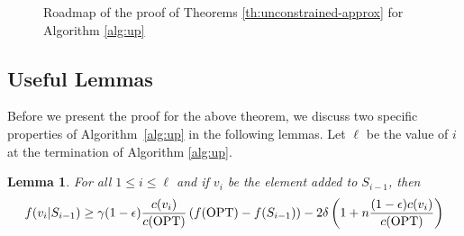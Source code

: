 \documentclass[10pt]{article} %
\newtheorem{lemma}[theorem]{Lemma}
\theoremstyle{remark}
\newcommand{\OPT}{{\rm OPT}}
\begin{document}



\begin{figure}
\begin{figure}[omitted: a diagram of this paper's results, not reproduced here]\end{figure}
\caption{Roadmap of the proof of Theorems \ref{th:unconstrained-approx} for Algorithm \ref{alg:up}}
\label{fig:roadmap-approx}
\end{figure}



\subsection{Useful Lemmas}
Before we present the proof for the above theorem, we discuss two specific properties of Algorithm~\ref{alg:up}
in the following lemmas. Let $\ell$ be the value of $i$ at the termination of Algorithm \ref{alg:up}.

\begin{lemma}
\label{lem:marginal-gain-approx}
For all $1 \leq i \leq \ell$ and if $v_i$ be the element added to $S_{i-1}$, then
\[ 
f(v_i|S_{i-1}) \geq \gamma(1-\epsilon)\frac{c(v_i)}{c(\OPT)} \left( f(\OPT)-f(S_{i-1})\right) - 2\delta  \left( 1+n\frac{(1-\epsilon)c(v_i)}{ c(\OPT)} \right) 
\]
\end{lemma}
\end{document}
